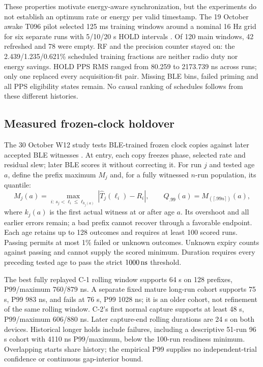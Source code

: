 \documentclass[11pt,letterpaper]{article}
\begin{document}
These properties motivate energy-aware synchronization, but the experiments do not establish an optimum rate or energy per valid timestamp. The 19 October awake T096 pilot selected 125 ms training windows around a nominal 16 Hz grid for six separate runs with 5/10/20 s HOLD intervals \cite{power}. Of 120 main windows, 42 refreshed and 78 were empty. RF and the precision counter stayed on: the 2.439/1.235/0.621\% scheduled training fractions are neither radio duty nor energy savings. HOLD PPS RMS ranged from 80.259 to 2173.739 ns across runs; only one replaced every acquisition-fit pair. Missing BLE bins, failed priming and all PPS eligibility states remain. No causal ranking of schedules follows from these different histories.

\subsection{Measured frozen-clock holdover}
The 30 October W12 study tests BLE-trained frozen clock copies against later accepted BLE witnesses \cite{holdover}. At entry, each copy freezes phase, selected rate and residual slew; later BLE scores it without correcting it. For run $j$ and tested age $a$, define the prefix maximum $M_j$ and, for a fully witnessed $n$-run population, its quantile:
\begin{equation}
 M_j(a)=\max_{i:\,s_j<\ell_i\leq\ell_{k_j(a)}}|\widehat T_j(\ell_i)-R_i|,
 \qquad Q_{.99}(a)=M_{(\lceil .99 n\rceil)}(a),
\end{equation}
where $k_j(a)$ is the first actual witness at or after age $a$. Its overshoot and all earlier errors remain; a bad prefix cannot recover through a favorable endpoint. Each age retains up to 128 outcomes and requires at least 100 scored runs. Passing permits at most 1\% failed or unknown outcomes. Unknown expiry counts against passing and cannot supply the scored minimum. Duration requires every preceding tested age to pass the strict $1000\,\mathrm{ns}$ threshold.

The best fully replayed C-1 rolling window supports 64 s on 128 prefixes, P99/maximum 760/879 ns. A separate fixed mature long-run cohort supports 75 s, P99 983 ns, and fails at 76 s, P99 1028 ns; it is an older cohort, not refinement of the same rolling window. C-2's first normal capture supports at least 48 s, P99/maximum 606/880 ns. Later capture-end rolling durations are 24 s on both devices. Historical longer holds include failures, including a descriptive 51-run 96 s cohort with 4110 ns P99/maximum, below the 100-run readiness minimum. Overlapping starts share history; the empirical P99 supplies no independent-trial confidence or continuous gap-interior bound.
\end{document}
